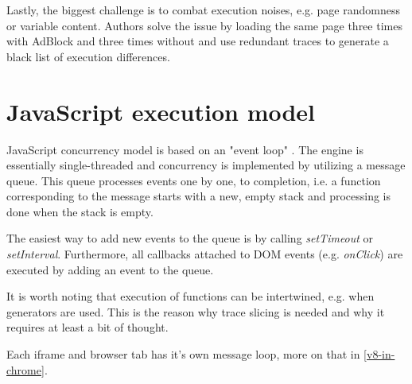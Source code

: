 Lastly, the biggest challenge is to combat execution noises, e.g. page randomness or variable content.
Authors solve the issue by loading the same page three times with AdBlock and three times without and
use redundant traces to generate a black list of execution differences.


\section{JavaScript execution model}
\label{js-exec-model}

JavaScript concurrency model is based on an "event loop" \cite{mozilla:event-loop}. The engine is essentially single-threaded
and concurrency is implemented by utilizing a message queue. This queue processes events one by one, to completion, i.e.
a function corresponding to the message starts with a new, empty stack and processing is done when the stack is empty.

The easiest way to add new events to the queue is by calling \emph{setTimeout} or \emph{setInterval}.
Furthermore, all callbacks attached to DOM events (e.g. \emph{onClick}) are executed by adding an event to the queue.

It is worth noting that execution of functions can be intertwined, e.g. when generators are used.
This is the reason why trace slicing is needed and why it requires at least a bit of thought.

Each iframe and browser tab has it's own message loop, more on that in \ref{v8-in-chrome}.